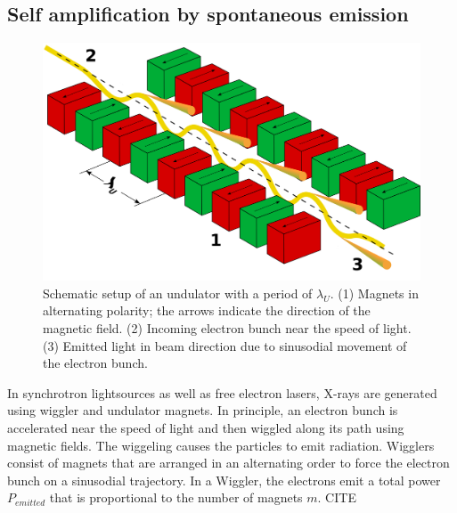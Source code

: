 \subsection{Self amplification by spontaneous emission}\label{sec:sase}
\begin{figure}[t]
	\centering
		\includegraphics[width=1.00\textwidth]{images/Undulator.png}
	\caption{Schematic setup of an undulator with a period of $\lambda_{U}$. (1) Magnets in alternating polarity; the arrows indicate the direction of the magnetic field. (2) Incoming electron bunch near the speed of light. (3) Emitted light in beam direction due to sinusodial movement of the electron bunch. \cite{holst-2005-wiki}}
	\label{fig:undulator}
\end{figure}
In synchrotron lightsources as well as free electron lasers, X-rays are generated using wiggler and undulator magnets. In principle, an electron bunch is accelerated near the speed of light and then wiggled along its path using magnetic fields. The wiggeling causes the particles to emit radiation. Wigglers consist of magnets that are arranged in an alternating order to force the electron bunch on a sinusodial trajectory. In a Wiggler, the electrons emit a total power $P_{emitted}$ that is proportional to the number of magnets $m$. CITE
